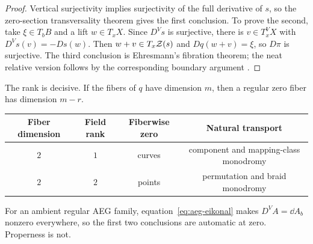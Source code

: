 \begin{proof}
Vertical surjectivity implies surjectivity of the full derivative of $s$, so the
zero-section transversality theorem gives the first conclusion.  To prove the
second, take $\xi\in T_bB$ and a lift $w\in T_xX$.  Since $D^Vs$ is surjective,
there is $v\in T_x^VX$ with $D^Vs(v)=-Ds(w)$.  Then
$w+v\in T_x\mathcal Z(s)$ and $Dq(w+v)=\xi$, so $D\pi$ is surjective.  The third
conclusion is Ehresmann's fibration theorem; the neat relative version follows by
the corresponding boundary argument \cite{Ehresmann1952Connexions}.
\end{proof}

The rank is decisive.  If the fibers of $q$ have dimension $m$, then a regular
zero fiber has dimension $m-r$.

\begin{center}
\small
\begin{tabular}{cccc}
\toprule
Fiber dimension & Field rank & Fiberwise zero & Natural transport \\
\midrule
$2$ & $1$ & curves & component and mapping-class monodromy \\
$2$ & $2$ & points & permutation and braid monodromy \\
\bottomrule
\end{tabular}
\end{center}

For an ambient regular AEG family, equation~\eqref{eq:aeg-eikonal} makes
$D^VA=\dd A_b$ nonzero everywhere, so the first two conclusions are automatic at
zero.  Properness is not.

